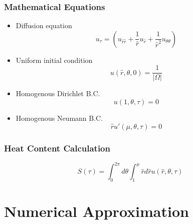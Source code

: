     \subsubsection{Mathematical Equations}
      \begin{itemize}
        \item Diffusion equation
          \begin{equation}\label{eq:DA_polar_diffusion}
             u_\tau = (u_{\hat r \hat r} + \frac{1}{\hat r} u_{\hat r} + \frac{1}{\hat r ^2} u_{\theta\theta})
          \end{equation}

        \item Uniform initial condition
          \begin{equation}\label{eq:DA_initial_bc}
            u(\hat r, \theta, 0) = \frac{1}{|\Omega|}
          \end{equation}

        \item Homogenous Dirichlet B.C.
          \begin{equation}\label{eq:DA_Dirichlet_bc}
            u(1, \theta, \tau) = 0
          \end{equation}

        \item Homogenous Neumann B.C.
           \begin{equation}\label{eq:DA_Neumann_bc}
              \hat r u'(\mu, \theta, \tau) = 0
           \end{equation}
           
      \end{itemize}

       

     \subsubsection{Heat Content Calculation}
       \begin{equation}\label{eq:heat_content_annulus}
         S(\tau) = \int_{0}^{2\pi} d\theta \int_{1}^{\mu} \hat r d \hat r u(\hat r, \theta, \tau)
       \end{equation}
       
          
\section{Numerical Approximation}

